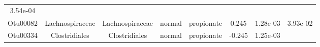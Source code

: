 \documentclass[11pt,]{article}
\begin{document}
\begin{longtable}[]{@{}cccccccc@{}}
\begin{minipage}[t]{0.08\columnwidth}
3.54e-04\strut
\end{minipage}\tabularnewline
\begin{minipage}[t]{0.08\columnwidth}\centering\strut
Otu00082\strut
\end{minipage} & \begin{minipage}[t]{0.15\columnwidth}\centering\strut
Lachnospiraceae\strut
\end{minipage} & \begin{minipage}[t]{0.15\columnwidth}\centering\strut
Lachnospiraceae\strut
\end{minipage} & \begin{minipage}[t]{0.08\columnwidth}\centering\strut
normal\strut
\end{minipage} & \begin{minipage}[t]{0.09\columnwidth}\centering\strut
propionate\strut
\end{minipage} & \begin{minipage}[t]{0.07\columnwidth}\centering\strut
0.245\strut
\end{minipage} & \begin{minipage}[t]{0.08\columnwidth}\centering\strut
1.28e-03\strut
\end{minipage} & \begin{minipage}[t]{0.08\columnwidth}\centering\strut
3.93e-02\strut
\end{minipage}\tabularnewline
\begin{minipage}[t]{0.08\columnwidth}\centering\strut
Otu00334\strut
\end{minipage} & \begin{minipage}[t]{0.15\columnwidth}\centering\strut
Clostridiales\strut
\end{minipage} & \begin{minipage}[t]{0.15\columnwidth}\centering\strut
Clostridiales\strut
\end{minipage} & \begin{minipage}[t]{0.08\columnwidth}\centering\strut
normal\strut
\end{minipage} & \begin{minipage}[t]{0.09\columnwidth}\centering\strut
propionate\strut
\end{minipage} & \begin{minipage}[t]{0.07\columnwidth}\centering\strut
-0.245\strut
\end{minipage} & \begin{minipage}[t]{0.08\columnwidth}\centering\strut
1.25e-03\strut
\end{minipage} & \begin{minipage}[t]{0.08\columnwidth}\centering\strut

\end{minipage}
\end{longtable}
\end{document}
